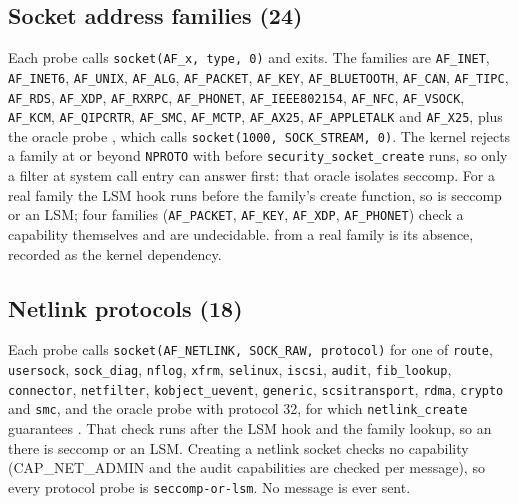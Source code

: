 \subsection{Socket address families (24)}
{\raggedright
Each probe calls \texttt{socket(AF\_x, type, 0)} and exits. The families are \texttt{AF\_INET}, \texttt{AF\_INET6}, \texttt{AF\_UNIX}, \texttt{AF\_ALG}, \texttt{AF\_PACKET}, \texttt{AF\_KEY}, \texttt{AF\_BLUETOOTH}, \texttt{AF\_CAN}, \texttt{AF\_TIPC}, \texttt{AF\_RDS}, \texttt{AF\_XDP}, \texttt{AF\_RXRPC}, \texttt{AF\_PHONET}, \texttt{AF\_IEEE802154}, \texttt{AF\_NFC}, \texttt{AF\_VSOCK}, \texttt{AF\_KCM}, \texttt{AF\_QIPCRTR}, \texttt{AF\_SMC}, \texttt{AF\_MCTP}, \texttt{AF\_AX25}, \texttt{AF\_APPLETALK} and \texttt{AF\_X25}, plus the oracle probe , which calls \texttt{socket(1000, SOCK\_STREAM, 0)}. The kernel rejects a family at or beyond \texttt{NPROTO} with  before \texttt{security\_socket\_create} runs, so only a filter at system call entry can answer  first: that oracle isolates seccomp. For a real family the LSM hook runs before the family's create function, so  is seccomp or an LSM; four families (\texttt{AF\_PACKET}, \texttt{AF\_KEY}, \texttt{AF\_XDP}, \texttt{AF\_PHONET}) check a capability themselves and are undecidable.  from a real family is its absence, recorded as the kernel dependency.\par}

\subsection{Netlink protocols (18)}
{\raggedright
Each probe calls \texttt{socket(AF\_NETLINK, SOCK\_RAW, protocol)} for one of \texttt{route}, \texttt{usersock}, \texttt{sock\_diag}, \texttt{nflog}, \texttt{xfrm}, \texttt{selinux}, \texttt{iscsi}, \texttt{audit}, \texttt{fib\_lookup}, \texttt{connector}, \texttt{netfilter}, \texttt{kobject\_uevent}, \texttt{generic}, \texttt{scsitransport}, \texttt{rdma}, \texttt{crypto} and \texttt{smc}, and the oracle probe with protocol 32, for which \texttt{netlink\_create} guarantees . That check runs after the LSM hook and the family lookup, so an  there is seccomp or an LSM. Creating a netlink socket checks no capability (CAP\_NET\_ADMIN and the audit capabilities are checked per message), so every protocol probe is \texttt{seccomp-or-lsm}. No message is ever sent.\par}

